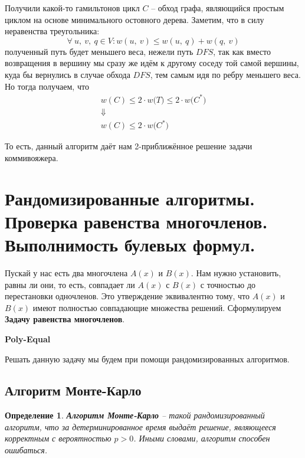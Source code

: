 \documentclass[a4paper,12pt]{article}
\newtheorem{definition}{Определение}
\begin{document}
Получили какой-то гамильтонов цикл $C$ -- обход графа, являющийся простым циклом на основе минимального остовного дерева. Заметим, что в силу неравенства треугольника: \[\forall\ u,\ v,\ q \in V: w(u,\ v) \leqslant w(u,\ q) + w(q,\ v)\] полученный путь будет меньшего веса, нежели путь $DFS$, так как вместо возвращения в вершину мы сразу же идём к другому соседу той самой вершины, куда бы вернулись в случае обхода $DFS$, тем самым идя по ребру меньшего веса. Но тогда получаем, что
\begin{gather*}
    w(C) \leqslant 2\cdot w\big(T\big) \leqslant 2\cdot w\big(C^*\big) \\
    \Downarrow\\
    w(C) \leqslant 2\cdot w\big(C^*\big)
\end{gather*}

То есть, данный алгоритм даёт нам 2-приближённое решение задачи коммивояжера.

\newpage
\section{Рандомизированные алгоритмы.\\ Проверка равенства многочленов.\\ Выполнимость булевых формул.}

Пускай у нас есть два многочлена $A(x)$ и $B(x)$. Нам нужно установить, равны ли они, то есть, совпадает ли $A(x)$ с $B(x)$ с точностью до перестановки одночленов. Это утверждение эквивалентно тому, что $A(x)$ и $B(x)$ имеют полностью совпадающие множества решений. Сформулируем \textbf{Задачу равенства многочленов}.

\textbf{Poly-Equal}
\begin{algorithmic}
\end{algorithmic}

Решать данную задачу мы будем при помощи рандомизированных алгоритмов.

\subsection{Алгоритм Монте-Карло}

\begin{definition}
    \textbf{Алгоритм Монте-Карло} -- такой рандомизированный алгоритм, что за детерминированное время выдаёт решение, являющееся корректным с вероятностью $p > 0$. Иными словами, алгоритм способен ошибаться.
\end{definition}
\end{document}
